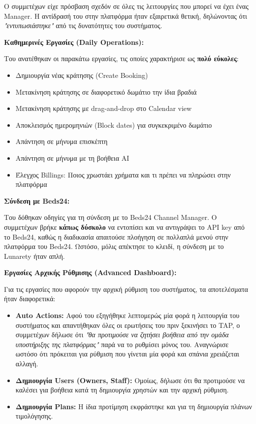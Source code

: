 \documentclass[
	12pt, %
	oneside, %
	greek,
	onehalfspacing, %
	liststotoc, %
	toctotoc, %
	parskip, %
	headsepline, %
]{MastersDoctoralThesis} %
\begin{document}
Ο συμμετέχων είχε πρόσβαση σχεδόν σε όλες τις λειτουργίες που μπορεί να έχει ένας Manager. Η αντίδρασή του στην πλατφόρμα ήταν εξαιρετικά θετική, δηλώνοντας ότι \textit{"εντυπωσιάστηκε"} από τις δυνατότητες του συστήματος.

\textbf{Καθημερινές Εργασίες (Daily Operations):}

Του ανατέθηκαν οι παρακάτω εργασίες, τις οποίες χαρακτήρισε ως \textbf{πολύ εύκολες}:

\begin{itemize}
    \item Δημιουργία νέας κράτησης (Create Booking)
    \item Μετακίνηση κράτησης σε διαφορετικό δωμάτιο την ίδια βραδιά
    \item Μετακίνηση κράτησης με drag-and-drop στο Calendar view
    \item Αποκλεισμός ημερομηνιών (Block dates) για συγκεκριμένο δωμάτιο
    \item Απάντηση σε μήνυμα επισκέπτη
    \item Απάντηση σε μήνυμα με τη βοήθεια AI
    \item Έλεγχος Billings: Ποιος χρωστάει χρήματα και τι πρέπει να πληρώσει στην πλατφόρμα
\end{itemize}

\textbf{Σύνδεση με Beds24:}

Του δόθηκαν οδηγίες για τη σύνδεση με το Beds24 Channel Manager. Ο συμμετέχων βρήκε \textbf{κάπως δύσκολο} να εντοπίσει και να αντιγράψει το API key από το Beds24, καθώς η διαδικασία απαιτούσε πλοήγηση σε πολλαπλά μενού στην πλατφόρμα του Beds24. Ωστόσο, μόλις απέκτησε το κλειδί, η σύνδεση με το Lunarety ήταν απλή.

\textbf{Εργασίες Αρχικής Ρύθμισης (Advanced Dashboard):}

Για τις εργασίες που αφορούν την αρχική ρύθμιση του συστήματος, τα αποτελέσματα ήταν διαφορετικά:

\begin{itemize}
    \item \textbf{Auto Actions:} Αφού του εξηγήθηκε λεπτομερώς μία φορά η λειτουργία του συστήματος και απαντήθηκαν όλες οι ερωτήσεις του πριν ξεκινήσει το TAP, ο συμμετέχων δήλωσε ότι \textit{"θα προτιμούσε να ζητήσει βοήθεια από την ομάδα υποστήριξης της πλατφόρμας"} παρά να το ρυθμίσει μόνος του. Αναγνώρισε ωστόσο ότι πρόκειται για ρύθμιση που γίνεται μία φορά και σπάνια χρειάζεται αλλαγή.
    \item \textbf{Δημιουργία Users (Owners, Staff):} Ομοίως, δήλωσε ότι θα προτιμούσε να καλέσει για βοήθεια κατά τη δημιουργία χρηστών και την αρχική ρύθμιση.
    \item \textbf{Δημιουργία Plans:} Η ίδια προτίμηση εκφράστηκε και για τη δημιουργία πλάνων τιμολόγησης.
\end{itemize}
\end{document}
